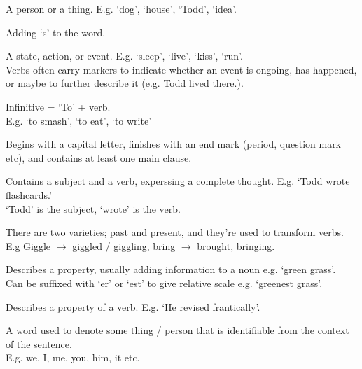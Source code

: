  {
	A person or a thing. E.g. `dog', `house', `Todd', `idea'.
}

 {
	Adding `s' to the word.
}

 {
	A state, action, or event. E.g. `sleep', `live', `kiss', `run'.
	\\\vspace{0.5em}
	Verbs often carry markers to indicate whether an event is ongoing, has happened, or
	maybe to further describe it (e.g. Todd lived there.).
}



 {
	Infinitive = `To' + verb.
	\\\vspace{0.5em}
	E.g. `to smash', `to eat', `to write'
}

 {
	Begins with a capital letter, finishes with an end mark (period, question mark etc), and contains at
	least one main clause.
}

 {
	Contains a subject and a verb, experssing a complete thought. E.g. `Todd wrote flashcards.'
	\\\vspace{0.5em}
	`Todd' is the subject, `wrote' is the verb.
}

 {
	There are two varieties; past and present, and they're used to transform verbs.
	\\\vspace{0.5em}
	E.g Giggle $\rightarrow$ giggled / giggling, bring $\rightarrow$ brought, bringing.
}


 {
	Describes a property, usually adding information to a noun e.g. `green grass'.
	\\\vspace{0.5em}
	Can be suffixed with `er' or `est' to give relative scale e.g. `greenest grass'.
}

 {
	Describes a property of a verb. E.g. `He revised frantically'.
}

 {
	A word used to denote some thing / person that is identifiable from the context of the sentence.
	\\\vspace{0.5em}
	E.g. we, I, me, you, him, it etc.
}

